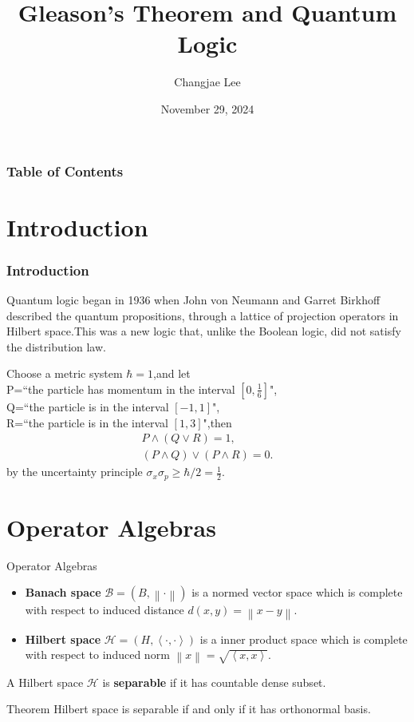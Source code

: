 \documentclass{beamer}
\title{Gleason's Theorem and Quantum Logic}
\author{Changjae Lee\inst{1}}
\institute[SNU]{
    \inst{1}
    Department of Mathematical Science\\
    Seoul National University
}
\date{November 29, 2024}
\begin{document}
\frame{\titlepage}

\begin{frame}
    \frametitle{Table of Contents}
    \tableofcontents
\end{frame}

\section{Introduction}
\begin{frame}
    \frametitle{Introduction}
Quantum logic began in 1936 when John von Neumann and Garret Birkhoff described the quantum propositions, through a lattice of projection operators in Hilbert space.\pause This was a new logic that, unlike the Boolean logic, did not satisfy the distribution law.\pause

\begin{examples}
    Choose a metric system \(\hbar=1\),\pause and let \\
    P=``the particle has momentum in the interval \([0,\frac{1}{6}]\)",\pause\\
    Q=``the particle is in the interval \([-1,1]\)",\pause\\
    R=``the particle is in the interval \([1,3]\)",\pause then
    \begin{gather*}
        P \wedge (Q\vee R) = 1,\\
    (P \wedge Q) \vee (P \wedge R) = 0.
    \end{gather*}
    by the uncertainty principle
    \(\sigma_{x} \sigma_{p} \ge \hbar/2=\frac{1}{2}\).
\end{examples}

\end{frame}


\section{Operator Algebras}

\begin{frame}{Operator Algebras}
    \begin{itemize}
        \item \textbf{Banach space} \(\mathcal{B}=(B,\left \lVert \cdot \right \rVert)\) is a normed vector space which is complete with respect to induced distance \(d(x,y)=\left \lVert x-y \right \rVert\). \pause
        \item \textbf{Hilbert space} \(\mathcal{H}=(H,\left \langle \cdot,\cdot \right \rangle)\) is a inner product space which is complete with respect to induced norm \(\left \lVert x \right \rVert =\sqrt{\left \langle x,x \right \rangle}\).\pause
    \end{itemize}
    A Hilbert space \(\mathcal{H}\) is \textbf{separable} if it has countable dense subset.
    \begin{block}{Theorem}
        Hilbert space is separable if and only if it has orthonormal basis.
    \end{block}
\end{frame}
\end{document}
